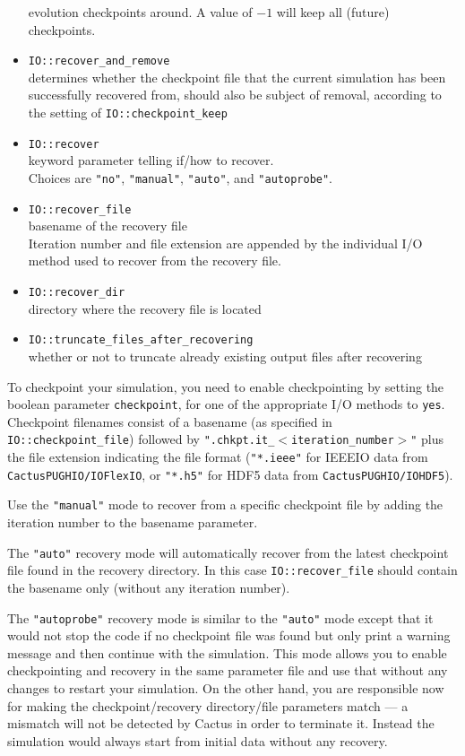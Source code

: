 \documentclass{article}
\begin{document}
\begin{itemize}
    evolution checkpoints around. A value of $-1$ will keep all (future) checkpoints.
  \item {\tt IO::recover\_and\_remove}\\
    determines whether the checkpoint file that the current simulation has
    been successfully recovered from, should also be subject of removal,
    according to the setting of {\tt IO::checkpoint\_keep}
  \item {\tt IO::recover}\\
    keyword parameter telling if/how to recover.\\
    Choices are {\tt "no"}, {\tt "manual"}, {\tt "auto"}, and {\tt "autoprobe"}.
  \item {\tt IO::recover\_file}\\
    basename of the recovery file\\
    Iteration number and file extension are appended by the individual I/O
    method used to recover from the recovery file.
  \item {\tt IO::recover\_dir}\\
    directory where the recovery file is located
  \item {\tt IO::truncate\_files\_after\_recovering}\\
    whether or not to truncate already existing output files after recovering
\end{itemize}

To checkpoint your simulation, you need to enable checkpointing by setting
the boolean parameter {\tt checkpoint}, for one of the appropriate I/O methods to
{\tt yes}.
Checkpoint filenames consist of a basename (as specified in {\tt
IO::checkpoint\_file}) followed by {\tt ".chkpt.it\_$<$iteration\_number$>$"}
plus the file extension indicating the file format ({\tt "*.ieee"} for IEEEIO
data from {\tt CactusPUGHIO/IOFlexIO}, or {\tt "*.h5"} for HDF5 data from
{\tt CactusPUGHIO/IOHDF5}).

Use the {\tt "manual"} mode to recover from a specific checkpoint file by adding
the iteration number to the basename parameter.

The {\tt "auto"} recovery mode will automatically recover from the latest
checkpoint file found in the recovery directory.
In this case {\tt IO::recover\_file} should contain the basename only (without
any iteration number).

The {\tt "autoprobe"} recovery mode is similar to the {\tt "auto"} mode except
that it would not stop the code if no checkpoint file was found but only print
a warning message and then continue with the simulation. This mode allows you
to enable checkpointing and recovery in the same parameter file and use that
without any changes to restart your simulation. On the other hand, you are
responsible now for making the checkpoint/recovery directory/file parameters
match --- a mismatch will not be detected by Cactus in order to terminate it.
Instead the simulation would always start from initial data without any
recovery.
\end{document}
